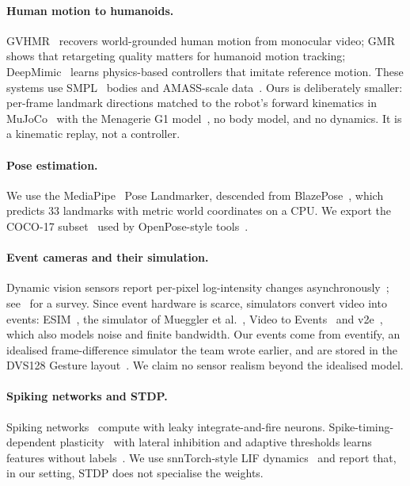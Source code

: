 \documentclass[10pt]{article}
\begin{document}
\paragraph{Human motion to humanoids.} GVHMR~\cite{shen2024gvhmr} recovers world-grounded human motion from monocular video; GMR~\cite{araujo2025gmr} shows that retargeting quality matters for humanoid motion tracking; DeepMimic~\cite{peng2018deepmimic} learns physics-based controllers that imitate reference motion. These systems use SMPL~\cite{loper2015smpl} bodies and AMASS-scale data~\cite{mahmood2019amass}. Ours is deliberately smaller: per-frame landmark directions matched to the robot's forward kinematics in MuJoCo~\cite{todorov2012mujoco} with the Menagerie G1 model~\cite{menagerie2022,unitreeg1}, no body model, and no dynamics. It is a kinematic replay, not a controller.

\paragraph{Pose estimation.} We use the MediaPipe~\cite{lugaresi2019mediapipe} Pose Landmarker, descended from BlazePose~\cite{bazarevsky2020blazepose}, which predicts 33 landmarks with metric world coordinates on a CPU. We export the COCO-17 subset~\cite{lin2014coco} used by OpenPose-style tools~\cite{cao2021openpose}.

\paragraph{Event cameras and their simulation.} Dynamic vision sensors report per-pixel log-intensity changes asynchronously~\cite{lichtsteiner2008dvs,brandli2014davis}; see~\cite{gallego2022survey} for a survey. Since event hardware is scarce, simulators convert video into events: ESIM~\cite{rebecq2018esim}, the simulator of Mueggler et al.~\cite{mueggler2017dataset}, Video to Events~\cite{gehrig2020video2events} and v2e~\cite{hu2021v2e}, which also models noise and finite bandwidth. Our events come from eventify, an idealised frame-difference simulator the team wrote earlier, and are stored in the DVS128 Gesture layout~\cite{amir2017gesture}. We claim no sensor realism beyond the idealised model.

\paragraph{Spiking networks and STDP.} Spiking networks~\cite{maass1997spiking,gerstner2002spiking} compute with leaky integrate-and-fire neurons. Spike-timing-dependent plasticity~\cite{bi1998stdp} with lateral inhibition and adaptive thresholds learns features without labels~\cite{diehl2015unsupervised}. We use snnTorch-style LIF dynamics~\cite{eshraghian2023snntorch} and report that, in our setting, STDP does not specialise the weights.
\end{document}

